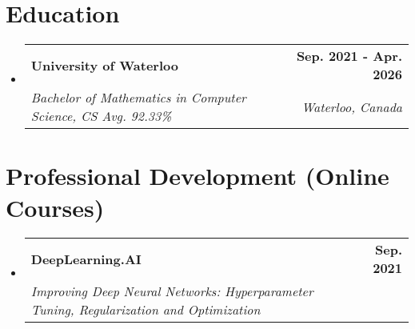 \documentclass[letterpaper,11pt]{article}
\makeatletter
\newcommand{\resumeSubheading}[4]{
  \vspace{-2pt}\item
    \begin{tabular*}{1.0\textwidth}[t]{l@{\extracolsep{\fill}}r}
      \textbf{#1} & \textbf{\small #2} \\
      \textit{\small#3} & \textit{\small #4} \\
    \end{tabular*}\vspace{-7pt}
}
\newcommand{\resumeSubHeadingListStart}{\begin{itemize}[leftmargin=0.0in, label={}]}
\newcommand{\resumeSubHeadingListEnd}{\end{itemize}}
\makeatother
\begin{document}
\section{Education}
\resumeSubHeadingListStart
\resumeSubheading
{University of Waterloo}{Sep. 2021 - Apr. 2026}{Bachelor of Mathematics in Computer Science, CS Avg. 92.33\%}{Waterloo, Canada}
\resumeSubHeadingListEnd


\section{Professional Development (Online Courses)}
\resumeSubHeadingListStart
\resumeSubheading
{DeepLearning.AI}{Sep. 2021}{Improving Deep Neural Networks: Hyperparameter Tuning, Regularization and Optimization}{}
\resumeSubHeadingListEnd
\end{document}
